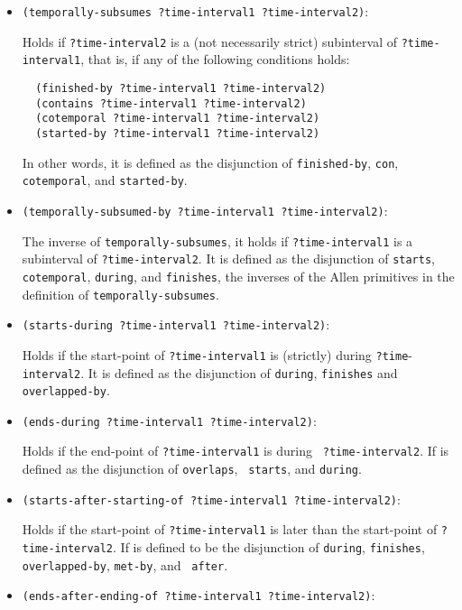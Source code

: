 \begin{itemize}
  \item{\verb'(temporally-subsumes ?time-interval1 ?time-interval2)':}

Holds if \verb'?time-interval2' is a (not necessarily strict) subinterval of
\verb'?time-interval1', that is, if any of the following conditions holds:
\begin{verbatim}
  (finished-by ?time-interval1 ?time-interval2)
  (contains ?time-interval1 ?time-interval2)
  (cotemporal ?time-interval1 ?time-interval2)
  (started-by ?time-interval1 ?time-interval2)
\end{verbatim}
In other words, it is defined as the disjunction of \verb'finished-by',
 \verb'con', \verb'cotemporal', and \verb'started-'\verb'by'.

\item{\verb'(temporally-subsumed-by ?time-interval1 ?time-interval2)':}

  The inverse of {\tt temporally-subsumes}, it holds if {\tt ?time-interval1}
  is a subinterval of {\tt ?time-interval2}.  It is
  defined as the disjunction of {\tt starts}, {\tt cotemporal},  {\tt during},
  and {\tt finishes}, the inverses of the Allen primitives in the definition
  of {\tt temporally-subsumes}.

\item{\verb'(starts-during ?time-interval1 ?time-interval2)':}

  Holds if the start-point of \verb'?time-interval1' is (strictly) during
  \verb'?time'-{\tt interval2}.  It is defined as the disjunction of
  \verb'during', \verb'finishes' and {\tt overlapped-by}.

\item{\verb'(ends-during ?time-interval1 ?time-interval2)':}

  Holds if the end-point of {\tt ?time-interval1} is during {\tt
  ?time-interval2}.  If is defined as the disjunction of {\tt overlaps}, {\tt
  starts}, and {\tt during}.

\item{\verb'(starts-after-starting-of ?time-interval1 ?time-interval2)':}

 Holds if the start-point of {\tt ?time-interval1} is later than the
 start-point of {\tt ?time-interval2}.  If is defined to be the disjunction
 of {\tt during}, {\tt finishes}, {\tt overlapped-by}, {\tt met-by}, and {\tt
 after}.

\item{\verb'(ends-after-ending-of ?time-interval1 ?time-interval2)':}


\end{itemize}
